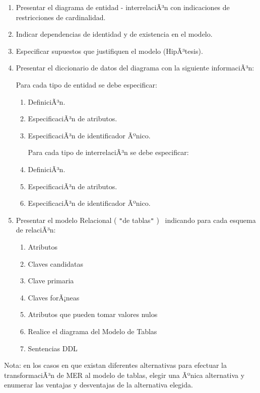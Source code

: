\documentclass[a4paper,11pt]{article}
\begin{document}
\begin{enumerate}
\item Presentar el diagrama de entidad - interrelaciÃ³n con indicaciones de restricciones 
de cardinalidad. 

\item Indicar dependencias de identidad y de existencia en el modelo. 

\item Especificar supuestos que justifiquen el modelo (HipÃ³tesis). 

\item Presentar el diccionario de datos del diagrama con la siguiente informaciÃ³n: 

Para cada tipo de entidad se debe especificar:

\begin{enumerate}
\item DefiniciÃ³n. 

\item EspecificaciÃ³n de atributos. 

\item EspecificaciÃ³n de identificador Ãºnico. 

Para cada tipo de interrelaciÃ³n se debe especificar: ~ 

\item DefiniciÃ³n. 

\item EspecificaciÃ³n de atributos. 

\item EspecificaciÃ³n de identificador Ãºnico. 
\end{enumerate}

\item Presentar el modelo Relacional ( \texttt{"}de tablas\texttt{"} )~ indicando 
para cada esquema de relaciÃ³n: 

\begin{enumerate}
\item Atributos 

\item Claves candidatas

\item Clave primaria

\item Claves forÃ¡neas 

\item Atributos que pueden tomar valores nulos

\item Realice el diagrama del Modelo de Tablas

\item Sentencias DDL
\end{enumerate}
\end{enumerate}

Nota: en los casos en que existan diferentes alternativas para efectuar la transformaciÃ³n 
de MER al modelo de tablas, elegir una Ãºnica alternativa y enumerar las ventajas 
y desventajas de la alternativa elegida. \pagebreak{}\label{HToc293405800}
\end{document}

